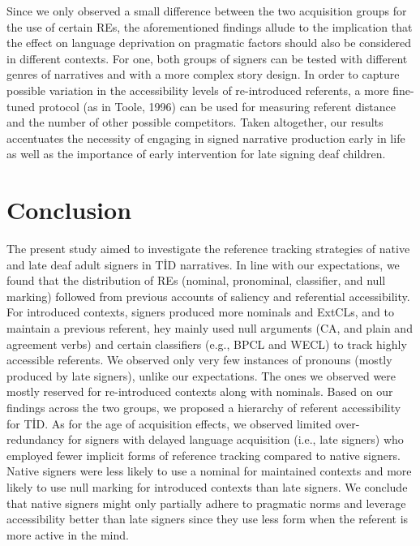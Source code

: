 \documentclass[]{elsarticle} %
\begin{document}
Since we only observed a small difference between the two acquisition
groups for the use of certain REs, the aforementioned findings allude to
the implication that the effect on language deprivation on pragmatic
factors should also be considered in different contexts. For one, both
groups of signers can be tested with different genres of narratives and
with a more complex story design. In order to capture possible variation
in the accessibility levels of re-introduced referents, a more
fine-tuned protocol (as in Toole, 1996) can be used for measuring
referent distance and the number of other possible competitors. Taken
altogether, our results accentuates the necessity of engaging in signed
narrative production early in life as well as the importance of early
intervention for late signing deaf children.

\hypertarget{conclusion}{%
\section{Conclusion}\label{conclusion}}

The present study aimed to investigate the reference tracking strategies
of native and late deaf adult signers in TİD narratives. In line with
our expectations, we found that the distribution of REs (nominal,
pronominal, classifier, and null marking) followed from previous
accounts of saliency and referential accessibility. For introduced
contexts, signers produced more nominals and ExtCLs, and to maintain a
previous referent, hey mainly used null arguments (CA, and plain and
agreement verbs) and certain classifiers (e.g., BPCL and WECL) to track
highly accessible referents. We observed only very few instances of
pronouns (mostly produced by late signers), unlike our expectations. The
ones we observed were mostly reserved for re-introduced contexts along
with nominals. Based on our findings across the two groups, we proposed
a hierarchy of referent accessibility for TİD. As for the age of
acquisition effects, we observed limited over-redundancy for signers
with delayed language acquisition (i.e., late signers) who employed
fewer implicit forms of reference tracking compared to native signers.
Native signers were less likely to use a nominal for maintained contexts
and more likely to use null marking for introduced contexts than late
signers. We conclude that native signers might only partially adhere to
pragmatic norms and leverage accessibility better than late signers
since they use less form when the referent is more active in the mind.
\end{document}
